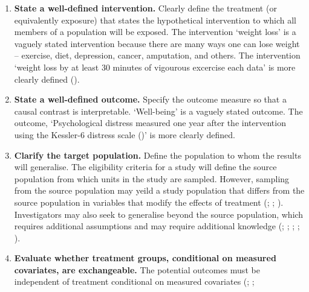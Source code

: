 \documentclass[
  single column]{article}
\begin{document}
\begin{enumerate}
\def\labelenumi{\arabic{enumi}.}
\item
  \textbf{State a well-defined intervention.} Clearly define the
  treatment (or equivalently exposure) that states the hypothetical
  intervention to which all members of a population will be exposed. The
  intervention `weight loss' is a vaguely stated intervention because
  there are many ways one can lose weight -- exercise, diet, depression,
  cancer, amputation, and others. The intervention `weight loss by at
  least 30 minutes of vigourous excercise each data' is more clearly
  defined
  ().
\item
  \textbf{State a well-defined outcome.} Specify the outcome measure so
  that a causal contrast is interpretable. `Well-being' is a vaguely
  stated outcome. The outcome, `Psychological distress measured one year
  after the intervention using the Kessler-6 distress scale
  ()' is more
  clearly defined.
\item
  \textbf{Clarify the target population.} Define the population to whom
  the results will generalise. The eligibility criteria for a study will
  define the source population from which units in the study are
  sampled. However, sampling from the source population may yeild a
  study population that differs from the source population in variables
  that modify the effects of treatment
  (;
  ;
  ).
  Investigators may also seek to generalise beyond the source
  population, which requires additional assumptions and may require
  additional knowledge (; ;
  ;
  ;
  ).
\item
  \textbf{Evaluate whether treatment groups, conditional on measured
  covariates, are exchangeable.} The potential outcomes must be
  independent of treatment conditional on measured covariates
  (;
  ;

\end{enumerate}
\end{document}
